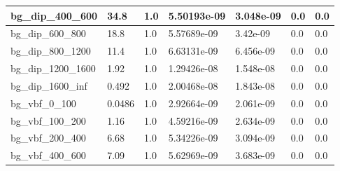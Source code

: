 \documentclass[a4paper, 10pt]{article}
\begin{document}
\begin{table}[H]
\begin{center}
\begin{tabular}{|m{23.0mm}|m{23.0mm}|m{18.0mm}|m{19.0mm}|m{19.0mm}|m{19.0mm}|m{19.0mm}|}
      \hline
      {\cellcolor{white}         bg\_dip\_400\_600}& {\cellcolor{white}         34.8}& {\cellcolor{white}         1.0}& {\cellcolor{white}         5.50193e-09}& {\cellcolor{white}         3.048e-09}& {\cellcolor{green}         0.0}& {\cellcolor{green}         0.0}\\
      \hline
      {\cellcolor{white}         bg\_dip\_600\_800}& {\cellcolor{white}         18.8}& {\cellcolor{white}         1.0}& {\cellcolor{white}         5.57689e-09}& {\cellcolor{white}         3.42e-09}& {\cellcolor{green}         0.0}& {\cellcolor{green}         0.0}\\
      \hline
      {\cellcolor{white}         bg\_dip\_800\_1200}& {\cellcolor{white}         11.4}& {\cellcolor{white}         1.0}& {\cellcolor{white}         6.63131e-09}& {\cellcolor{white}         6.456e-09}& {\cellcolor{green}         0.0}& {\cellcolor{green}         0.0}\\
      \hline
      {\cellcolor{white}         bg\_dip\_1200\_1600}& {\cellcolor{white}         1.92}& {\cellcolor{white}         1.0}& {\cellcolor{white}         1.29426e-08}& {\cellcolor{white}         1.548e-08}& {\cellcolor{green}         0.0}& {\cellcolor{green}         0.0}\\
      \hline
      {\cellcolor{white}         bg\_dip\_1600\_inf}& {\cellcolor{white}         0.492}& {\cellcolor{white}         1.0}& {\cellcolor{white}         2.00468e-08}& {\cellcolor{white}         1.843e-08}& {\cellcolor{green}         0.0}& {\cellcolor{green}         0.0}\\
      \hline
      {\cellcolor{white}         bg\_vbf\_0\_100}& {\cellcolor{white}         0.0486}& {\cellcolor{white}         1.0}& {\cellcolor{white}         2.92664e-09}& {\cellcolor{white}         2.061e-09}& {\cellcolor{green}         0.0}& {\cellcolor{green}         0.0}\\
      \hline
      {\cellcolor{white}         bg\_vbf\_100\_200}& {\cellcolor{white}         1.16}& {\cellcolor{white}         1.0}& {\cellcolor{white}         4.59216e-09}& {\cellcolor{white}         2.634e-09}& {\cellcolor{green}         0.0}& {\cellcolor{green}         0.0}\\
      \hline
      {\cellcolor{white}         bg\_vbf\_200\_400}& {\cellcolor{white}         6.68}& {\cellcolor{white}         1.0}& {\cellcolor{white}         5.34226e-09}& {\cellcolor{white}         3.094e-09}& {\cellcolor{green}         0.0}& {\cellcolor{green}         0.0}\\
      \hline
      {\cellcolor{white}         bg\_vbf\_400\_600}& {\cellcolor{white}         7.09}& {\cellcolor{white}         1.0}& {\cellcolor{white}         5.62969e-09}& {\cellcolor{white}         3.683e-09}& {\cellcolor{green}         0.0}& {\cellcolor{green}         0.0}\\

\end{tabular}
\end{center}
\end{table}
\end{document}
